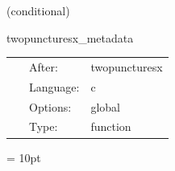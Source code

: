 \vspace{5mm}

   (conditional) 

\hspace{5mm} twopuncturesx\_metadata 

\hspace{5mm}{\it output twopuncturesx metadata } 


\hspace{5mm}

 \begin{tabular*}{160mm}{cll} 
~ & After:  & twopuncturesx \\ 
~ & Language:  & c \\ 
~ & Options:  & global \\ 
~ & Type:  & function \\ 
\end{tabular*} 



\vspace{5mm}\parskip = 10pt 

